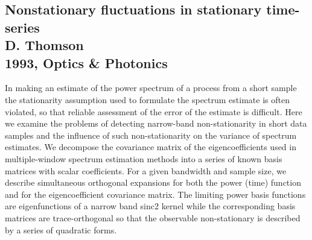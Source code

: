 \documentclass{article}
\begin{document}
\subsection{Nonstationary fluctuations in stationary time-series \\
D. Thomson \\
1993, Optics \& Photonics}
In making an estimate of the power spectrum of a process from a short sample the stationarity assumption used to formulate the spectrum estimate is often violated, so that reliable assessment of the error of the estimate is difficult. Here we examine the problems of detecting narrow-band non-stationarity in short data samples and the influence of such non-stationarity on the variance of spectrum estimates. We decompose the covariance matrix of the eigencoefficients used in multiple-window spectrum estimation methods into a series of known basis matrices with scalar coefficients. For a given bandwidth and sample size, we describe simultaneous orthogonal expansions for both the power (time) function and for the eigencoefficient covariance matrix. The limiting power basis functions are eigenfunctions of a narrow band sinc2 kernel while the corresponding basis matrices are trace-orthogonal so that the observable non-stationary is described by a series of quadratic forms. \\

\\
\end{document}
